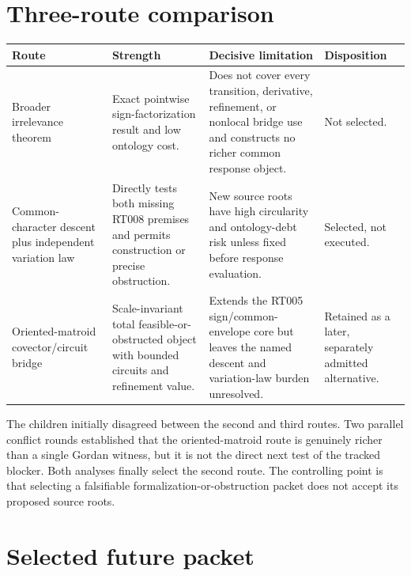 \documentclass[11pt]{article}
\begin{document}
\section{Three-route comparison}

\renewcommand{\arraystretch}{1.2}
\begin{longtable}{>{\raggedright\arraybackslash}p{}
                  >{\raggedright\arraybackslash}p{}
                  >{\raggedright\arraybackslash}p{}
                  >{\raggedright\arraybackslash}p{}}
\toprule
Route & Strength & Decisive limitation & Disposition\\
\midrule
\endhead
Broader irrelevance theorem & Exact pointwise sign-factorization result and
low ontology cost. & Does not cover every transition, derivative, refinement,
or nonlocal bridge use and constructs no richer common response object. & Not
selected.\\
Common-character descent plus independent variation law & Directly tests both
missing RT008 premises and permits construction or precise obstruction. & New
source roots have high circularity and ontology-debt risk unless fixed before
response evaluation. & Selected, not executed.\\
Oriented-matroid covector/circuit bridge & Scale-invariant total
feasible-or-obstructed object with bounded circuits and refinement value. &
Extends the RT005 sign/common-envelope core but leaves the named descent and
variation-law burden unresolved. & Retained as a later, separately admitted
alternative.\\
\bottomrule
\end{longtable}

The children initially disagreed between the second and third routes.  Two
parallel conflict rounds established that the oriented-matroid route is
genuinely richer than a single Gordan witness, but it is not the direct next
test of the tracked blocker.  Both analyses finally select the second route.
The controlling point is that selecting a falsifiable
formalization-or-obstruction packet does not accept its proposed source roots.

\section{Selected future packet}
\end{document}

